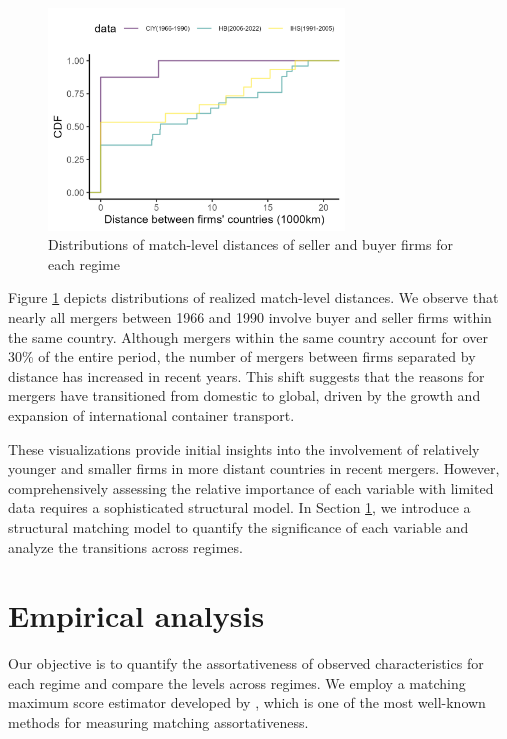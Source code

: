\documentclass[10pt]{article}
\begin{document}
\begin{figure}[!ht]
\begin{center}
  \includegraphics[width = 0.7\textwidth]
  {figuretable/distance_cdf.png}
  \caption{Distributions of match-level distances of seller and buyer firms for each regime}
  \label{fg:distance_cdf}
  \end{center}
\footnotesize
\end{figure}


Figure \ref{fg:distance_cdf} depicts distributions of realized match-level distances.
We observe that nearly all mergers between 1966 and 1990 involve buyer and seller firms within the same country. 
Although mergers within the same country account for over 30\% of the entire period, the number of mergers between firms separated by distance has increased in recent years. 
This shift suggests that the reasons for mergers have transitioned from domestic to global, driven by the growth and expansion of international container transport.

These visualizations provide initial insights into the involvement of relatively younger and smaller firms in more distant countries in recent mergers. 
However, comprehensively assessing the relative importance of each variable with limited data requires a sophisticated structural model. 
In Section \ref{sec:empirical_analysis}, we introduce a structural matching model to quantify the significance of each variable and analyze the transitions across regimes.




\section{Empirical analysis}\label{sec:empirical_analysis}

Our objective is to quantify the assortativeness of observed characteristics for each regime and compare the levels across regimes. 
We employ a matching maximum score estimator developed by \cite{fox2018qe}, which is one of the most well-known methods for measuring matching assortativeness.
\end{document}

